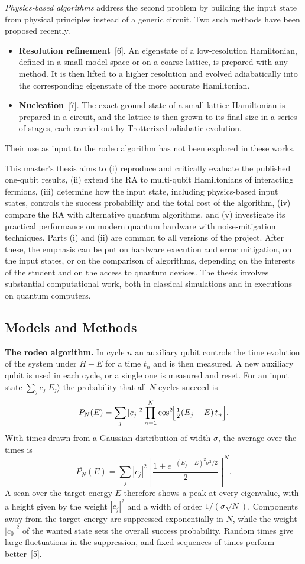 \documentclass[12pt,a4paper]{article}
\begin{document}
\emph{Physics-based algorithms} address the second problem by
building the input state from physical principles instead of a generic
circuit.  Two such methods have been proposed recently.
\begin{itemize}
  \item \textbf{Resolution refinement}~[6].  An eigenstate of a
  low-resolution Hamiltonian, defined in a small model space or on a
  coarse lattice, is prepared with any method.  It is then lifted to a
  higher resolution and evolved adiabatically into the corresponding
  eigenstate of the more accurate Hamiltonian.
  \item \textbf{Nucleation}~[7].  The exact ground state of a small
  lattice Hamiltonian is prepared in a circuit, and the lattice is
  then grown to its final size in a series of stages, each carried out
  by Trotterized adiabatic evolution.
\end{itemize}
Their use as input to the rodeo algorithm has not been explored in
these works.

This master's thesis aims to (i) reproduce and critically evaluate the
published one-qubit results, (ii) extend the RA to multi-qubit
Hamiltonians of interacting fermions, (iii) determine how the input
state, including physics-based input states, controls the success
probability and the total cost of the algorithm, (iv) compare the RA
with alternative quantum algorithms, and (v) investigate its practical
performance on modern quantum hardware with noise-mitigation
techniques.  Parts (i) and (ii) are common to all versions of the
project.  After these, the emphasis can be put on hardware execution
and error mitigation, on the input states, or on the comparison of
algorithms, depending on the interests of the student and on the
access to quantum devices.  The thesis involves substantial
computational work, both in classical simulations and in executions on
quantum computers.

\subsection*{Models and Methods}

\textbf{The rodeo algorithm.}  In cycle $n$ an auxiliary qubit
controls the time evolution of the system under $H-E$ for a time
$t_n$ and is then measured.  A new auxiliary qubit is used in each
cycle, or a single one is measured and reset.  For an input state
$\sum_jc_j|E_j\rangle$ the probability that all $N$ cycles succeed is
\[
  P_N(E)=\sum_j|c_j|^2\prod_{n=1}^{N}\cos^2\!\Bigl[\tfrac12(E_j-E)\,t_n\Bigr].
\]
With times drawn from a Gaussian distribution of width $\sigma$, the
average over the times is
\[
  \overline{P_N}(E)=\sum_j|c_j|^2
  \left[\frac{1+e^{-(E_j-E)^2\sigma^2/2}}{2}\right]^{N}.
\]
A scan over the target energy $E$ therefore shows a peak at every
eigenvalue, with a height given by the weight $|c_j|^2$ and a width of
order $1/(\sigma\sqrt N)$.  Components away from the target energy are
suppressed exponentially in $N$, while the weight $|c_0|^2$ of the
wanted state sets the overall success probability.  Random times give
large fluctuations in the suppression, and fixed sequences of times
perform better~[5].
\end{document}
